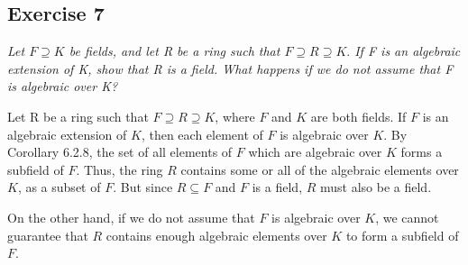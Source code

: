 \subsection*{Exercise 7}
\textit{Let $F \supseteq K$ be fields, and let R be a ring such that $F \supseteq R \supseteq K.$ If F is an algebraic extension of K, show that R is a field. What happens if we do not assume that F is algebraic over K?}

\vspace{5 mm}
Let R be a ring such that $F \supseteq R \supseteq K$, where $F$ and $K$ are both fields. If $F$ is an algebraic extension of $K$, then each element of $F$ is algebraic over $K$. By Corollary 6.2.8, the set of all elements of $F$ which are algebraic over $K$ forms a subfield of $F$. Thus, the ring $R$ contains some or all of the algebraic elements over $K$, as a subset of $F$. But since $R \subseteq F$ and $F$ is a field, $R$ must also be a field.

On the other hand, if we do not assume that $F$ is algebraic over $K$, we cannot guarantee that $R$ contains enough algebraic elements over $K$ to form a subfield of $F$.